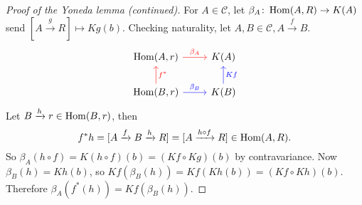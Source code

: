 \documentclass[xcolor=dvipsnames]{beamer}
\renewcommand\qedsymbol{$\boxtimes$}
\begin{document}
    \begin{frame}[fragile]
        \begin{proof}[Proof of the Yoneda lemma (continued)]\renewcommand{\qedsymbol}{}
            For $A \in \mathcal{C} $, let $\beta _A \colon \operatorname{Hom}(A,R) \to K(A)$ send $[A \xrightarrow g R] \mapsto Kg(b)$. 
            Checking naturality, let $A,B \in \mathcal{C}, A \xrightarrow fB $.\[
            \begin{tikzcd}
{\Hom(A,r)} \arrow[r, "\beta_A",red]                   & K(A)                  \\
{\Hom(B,r)} \arrow[r, "\beta_B",blue] \arrow[u, "f^*"',red] & K(B) \arrow[u, "Kf"',blue]
\end{tikzcd}
            \] 
            Let $B \xrightarrow hr \in \operatorname{Hom}(B,r)$, then 
            \[
                f^* h= [A \xrightarrow f B \xrightarrow hR]= [A \xrightarrow{ h \circ f}R] \in \operatorname{Hom}(A,R).
            \] 
            So $\beta _A (h \circ f)=K(h \circ f)(b)=(Kf \circ Kg)(b)$ by contravariance.
            Now $\beta _B(h)=Kh(b)$, so $Kf(\beta _B(h))=Kf(Kh(b))=(Kf \circ Kh)(b)$. Therefore $\beta _A(f^*(h))=Kf(\beta _B(h))$.
       \end{proof} 
\end{frame} 
\end{document}
